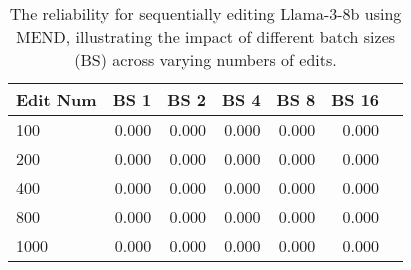 \begin{table}[t]
\centering
\begin{adjustbox}{max width=\linewidth} 
\begin{tabular}{lrrrrrr}
\toprule
Edit Num & BS 1 & BS 2 & BS 4 & BS 8 & BS 16 \\
\midrule
100 & \num{0.000} & \num{0.000} & \num{0.000} & \num{0.000} & \num{0.000} \\
200 & \num{0.000} & \num{0.000} & \num{0.000} & \num{0.000} & \num{0.000} \\
400 & \num{0.000} & \num{0.000} & \num{0.000} & \num{0.000} & \num{0.000} \\
800 & \num{0.000} & \num{0.000} & \num{0.000} & \num{0.000} & \num{0.000} \\
1000 & \num{0.000} & \num{0.000} & \num{0.000} & \num{0.000} & \num{0.000} \\

\bottomrule 
\end{tabular}
\end{adjustbox}
\caption{The reliability for sequentially editing Llama-3-8b using MEND, illustrating the impact of different batch sizes (BS) across varying numbers of edits.}
\label{tab:mend_batch}
\end{table}
